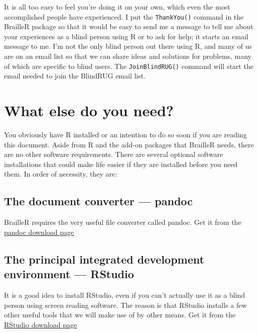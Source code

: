 \documentclass[
]{book}
\begin{document}
It is all too easy to feel you're doing it on your own, which even the most accomplished people have experienced. I put the \texttt{ThankYou()} command in the BrailleR package so that it would be easy to send me a message to tell me about your experiences as a blind person using R or to ask for help; it starts an email message to me. I'm not the only blind person out there using R, and many of us are on an email list so that we can share ideas and solutions for problems, many of which are specific to blind users. The \texttt{JoinBlindRUG()} command will start the email needed to join the BlindRUG email list.

\hypertarget{what-else-do-you-need}{%
\section{What else do you need?}\label{what-else-do-you-need}}

You obviously have R installed or an intention to do so soon if you are reading this document. Aside from R and the add-on packages that BrailleR needs, there are no other software requirements. There are several optional software installations that could make life easier if they are installed before you need them. In order of necessity, they are:

\hypertarget{the-document-converter-pandoc}{%
\subsection{The document converter --- pandoc}\label{the-document-converter-pandoc}}

BrailleR requires the very useful file converter called pandoc. Get it from the
\href{https://github.com/jgm/pandoc/releases}{pandoc download page}

\hypertarget{the-principal-integrated-development-environment-rstudio}{%
\subsection{The principal integrated development environment --- RStudio}\label{the-principal-integrated-development-environment-rstudio}}

It is a good idea to install RStudio, even if you can't actually use it as a blind person using screen reading software. The reason is that RStudio installs a few other useful tools that we will make use of by other means. Get it from the
\href{https://www.rstudio.com/products/rstudio/download2}{RStudio download page}
\end{document}
